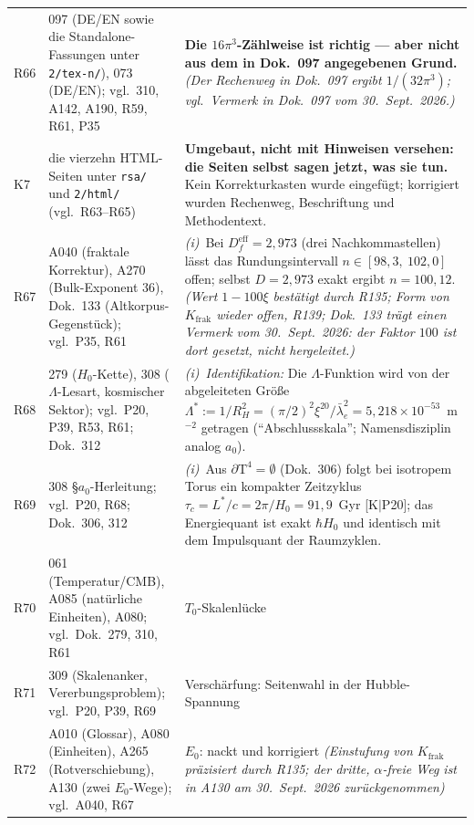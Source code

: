 \begin{longtable}{@{}p{0.9cm}p{3.1cm}p{10.2cm}@{}}
R66 & 097 (DE/EN sowie die Standalone-Fassungen unter \texttt{2/tex-n/}), 073 (DE/EN); vgl.\ 310, A142, A190, R59, R61, P35 & \textbf{Die $16\pi^3$-Zählweise ist richtig --- aber nicht aus dem in Dok.~097 angegebenen Grund.} \emph{(Der Rechenweg in Dok.~097 ergibt $1/(32\pi^3)$; vgl.\ Vermerk in Dok.~097 vom 30.~Sept.~2026.)} \\
K7 & die vierzehn HTML-Seiten unter \texttt{rsa/} und \texttt{2/html/} (vgl.\ R63--R65) & \textbf{Umgebaut, nicht mit Hinweisen versehen: die Seiten selbst sagen jetzt, was sie tun.} Kein Korrekturkasten wurde eingefügt; korrigiert wurden Rechenweg, Beschriftung und Methodentext. \\
R67 & A040 (fraktale Korrektur), A270 (Bulk-Exponent 36), Dok.~133 (Altkorpus-Gegenstück); vgl.\ P35, R61 & \emph{(i)}~Bei $D_f^\text{eff} = 2{,}973$ (drei Nachkommastellen) lässt das Rundungsintervall $n \in [98{,}3,\ 102{,}0]$ offen; selbst $D = 2{,}973$ exakt ergibt $n = 100{,}12$. \emph{(Wert $1-100\xi$ bestätigt durch R135; Form von $K_{\mathrm{frak}}$ wieder offen, R139; Dok.~133 trägt einen Vermerk vom 30.~Sept.~2026: der Faktor $100$ ist dort gesetzt, nicht hergeleitet.)} \\
R68 & 279 ($H_0$-Kette), 308 ($\Lambda$-Lesart, kosmischer Sektor); vgl.\ P20, P39, R53, R61; Dok.~312 & \emph{(i)~Identifikation:} Die $\Lambda$-Funktion wird von der abgeleiteten Größe $\Lambda^{*} := 1/R_H^2 = (\pi/2)^2\xi^{20}/ \bar\lambda_e^2 = 5{,}218\times10^{-53}$~m$^{-2}$ getragen (\enquote{Abschlussskala}; Namensdisziplin analog $a_0$). \\
R69 & 308 \S{}$a_0$-Herleitung; vgl.\ P20, R68; Dok.~306, 312 & \emph{(i)}~Aus $\partial\text{T}^4 = \emptyset$ (Dok.~306) folgt bei isotropem Torus ein kompakter Zeitzyklus $\tau_c = L^{*}/c = 2\pi/H_0 = 91{,}9$~Gyr [K$|$P20]; das Energiequant ist exakt $\hbar H_0$ und identisch mit dem Impulsquant der Raumzyklen. \\
R70 & 061 (Temperatur/CMB), A085 (natürliche Einheiten), A080; vgl.\ Dok.~279, 310, R61 & $T_0$-Skalenlücke \\
R71 & 309 (Skalenanker, Vererbungsproblem); vgl.\ P20, P39, R69 & Verschärfung: Seitenwahl in der
Hubble-Spannung \\
R72 & A010 (Glossar), A080 (Einheiten), A265 (Rotverschiebung), A130 (zwei $E_0$-Wege); vgl.\ A040, R67 & $E_0$: nackt
und korrigiert \emph{(Einstufung von $K_{\mathrm{frak}}$ präzisiert durch R135; der dritte, $\alpha$-freie Weg ist in A130 am 30.~Sept.~2026 zurückgenommen)} \\

\end{longtable}
